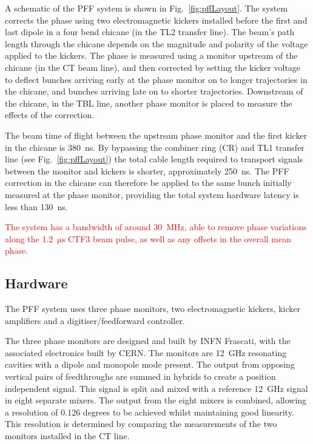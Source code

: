 \documentclass[%
 reprint,
 amsmath,amssymb,
 prl,
]{revtex4-1}
\begin{document}
A schematic of the PFF system is shown in Fig.~\ref{fig:pffLayout}. The system 
corrects the phase using two electromagnetic kickers installed 
before the first and last dipole in a four bend chicane (in the TL2 transfer 
line). The beam's path length 
through the chicane depends on the magnitude and polarity of the voltage 
applied to the kickers. The phase is measured using a monitor upstream of 
the chicane (in the CT beam line), and then corrected by setting the kicker 
voltage to deflect bunches arriving early at the phase monitor on to longer 
trajectories in the chicane, and bunches arriving late on to shorter 
trajectories. Downstream of the chicane, in the TBL line, another phase monitor 
is placed to measure the effects of the correction.

The beam time of flight between the upstream phase monitor and the first kicker 
in the chicane is 380~ns. By bypassing the combiner ring (CR) and TL1 transfer 
line (see Fig.~\ref{fig:pffLayout}) the total cable length required to 
transport signals between the monitor and kickers is shorter, approximately 
250~ns. The PFF correction in the chicane can therefore be applied to the same 
bunch initially measured at the phase monitor, providing the total system 
hardware latency is less than 130~ns. 

\textcolor{red}{The system has a bandwidth of around 
30~MHz, able to remove phase variations along the 1.2~\(\mathrm{\mu s}\) CTF3 
beam 
pulse, as well as any offsets in the overall mean phase.}


\subsection{\label{ss:hardware}Hardware}

The PFF system uses three phase monitors, two electromagnetic kickers, kicker 
amplifiers and a digitiser/feedforward controller.

The three phase monitors are designed and built by INFN Frascati, with the 
associated electronics built by CERN. The monitors are 12~GHz resonating 
cavities with a dipole and monopole mode present. The output from opposing 
vertical pairs of feedthroughs are summed in hybrids to create a position 
independent signal. This signal is split and mixed with a reference 12~GHz 
signal in eight separate mixers. The output from the eight mixers is combined, 
allowing a resolution of 0.126 degrees to be 
achieved whilst maintaining good linearity. This resolution is determined by 
comparing the measurements of the two monitors installed in the CT line.
\end{document}
